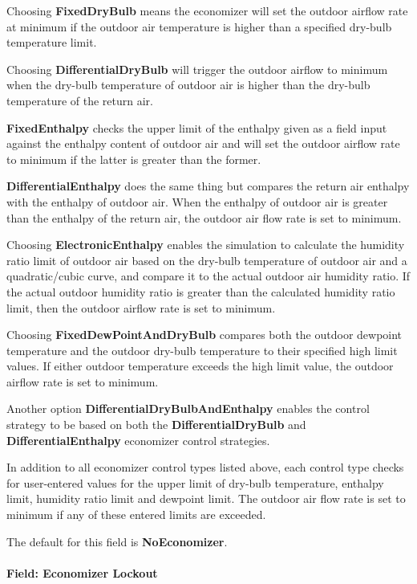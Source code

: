 Choosing \textbf{FixedDryBulb} means the economizer will set the outdoor airflow rate at minimum if the outdoor air temperature is higher than a specified dry-bulb temperature limit.

Choosing \textbf{DifferentialDryBulb} will trigger the outdoor airflow to minimum when the dry-bulb temperature of outdoor air is higher than the dry-bulb temperature of the return air.

\textbf{FixedEnthalpy} checks the upper limit of the enthalpy given as a field input against the enthalpy content of outdoor air and will set the outdoor airflow rate to minimum if the latter is greater than the former.

\textbf{DifferentialEnthalpy} does the same thing but compares the return air enthalpy with the enthalpy of outdoor air. When the enthalpy of outdoor air is greater than the enthalpy of the return air, the outdoor air flow rate is set to minimum.

Choosing \textbf{ElectronicEnthalpy} enables the simulation to calculate the humidity ratio limit of outdoor air based on the dry-bulb temperature of outdoor air and a quadratic/cubic curve, and compare it to the actual outdoor air humidity ratio. If the actual outdoor humidity ratio is greater than the calculated humidity ratio limit, then the outdoor airflow rate is set to minimum.

Choosing \textbf{FixedDewPointAndDryBulb} compares both the outdoor dewpoint temperature and the outdoor dry-bulb temperature to their specified high limit values. If either outdoor temperature exceeds the high limit value, the outdoor airflow rate is set to minimum.

Another option \textbf{DifferentialDryBulbAndEnthalpy} enables the control strategy to be based on both the \textbf{DifferentialDryBulb} and \textbf{DifferentialEnthalpy} economizer control strategies.

In addition to all economizer control types listed above, each control type checks for user-entered values for the upper limit of dry-bulb temperature, enthalpy limit, humidity ratio limit and dewpoint limit. The outdoor air flow rate is set to minimum if any of these entered limits are exceeded.

The default for this field is \textbf{NoEconomizer}.

\paragraph{Field: Economizer Lockout}\label{field-economizer-lockout-3}

